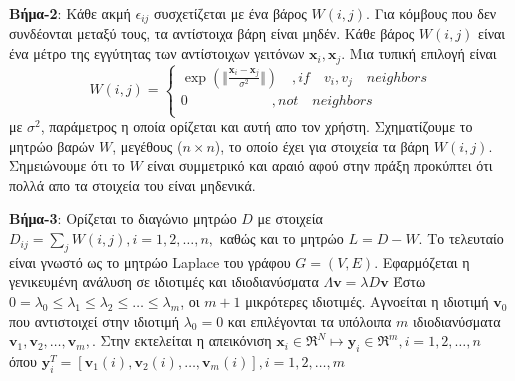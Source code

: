 \par
\textbf{Βήμα-2}: Κάθε ακμή $\epsilon_{ij}$ συσχετίζεται με ένα βάρος $W(i,j)$. Για κόμβους που δεν συνδέονται μεταξύ τους, τα αντίστοιχα βάρη είναι μηδέν. Κάθε βάρος $W(i,j)$ είναι ένα μέτρο της εγγύτητας των αντίστοιχων γειτόνων $\mathbf{x}_{i},\mathbf{x}_{j}$. Μια τυπική επιλογή είναι \\
\newline\hspace*{\fill}
\[W(i,j) = \begin{cases} \exp(\Vert \frac{\mathbf{x}_{i}-\mathbf{x}_{j}}{\sigma^{2}} \Vert) \quad ,if \quad v_{i},v_{j} \quad neighbors\\
               0  \quad \quad \quad \quad \quad \quad ,not \quad neighbors\\
            \end{cases} \]
\hspace*{\fill}\newline 
με $\sigma^{2}$, παράμετρος η οποία ορίζεται και αυτή απο τον χρήστη. Σχηματίζουμε το μητρώο βαρών $W$, μεγέθους ($n \times n$), το οποίο έχει για στοιχεία τα βάρη $W(i,j)$. Σημειώνουμε ότι το $W$ είναι συμμετρικό και αραιό αφού στην πράξη προκύπτει ότι πολλά απο τα στοιχεία του είναι μηδενικά.
\par
\textbf{Βήμα-3}: Ορίζεται το διαγώνιο μητρώο $D$ με στοιχεία $D_{ij}=\sum_{j} W(i,j),i=1,2,\ldots,n,$ καθώς και το μητρώο $L=D-W$. Το τελευταίο είναι γνωστό ως το μητρώο \textlatin{Laplace} του γράφου $G=(V,E)$. Εφαρμόζεται η γενικευμένη ανάλυση σε ιδιοτιμές και ιδιοδιανύσματα 
\newline\hspace*{\fill}
$ \Lambda \mathbf{v} =  \lambda D \mathbf{v} $
\hspace*{\fill}\newline 
Έστω $ 0 = \lambda_{0} \leq \lambda_{1} \leq \lambda_{2} \leq \ldots \leq \lambda_{m}$, οι $m+1$ μικρότερες ιδιοτιμές. Αγνοείται η ιδιοτιμή $\mathbf{v}_{0}$ που αντιστοιχεί στην ιδιοτιμή $\lambda_{0} = 0$ και επιλέγονται τα υπόλοιπα $m$ ιδιοδιανύσματα $\mathbf{v}_{1},\mathbf{v}_{2},\ldots,\mathbf{v}_{m},$. Στην εκτελείται η απεικόνιση
\newline\hspace*{\fill}
$\mathbf{x}_{i} \in \Re^{N} \mapsto \mathbf{y}_{i} \in \Re^{m}, i=1,2,\ldots,n$
\hspace*{\fill}\newline 
όπου 
\newline\hspace*{\fill}
$\mathbf{y}_{i}^{T} = [\mathbf{v}_{1}(i),\mathbf{v}_{2}(i),\ldots,\mathbf{v}_{m}(i)], i=1,2,\ldots,m$
